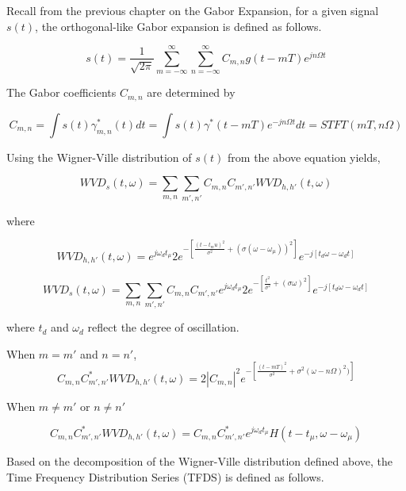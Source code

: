 Recall from the previous chapter on the Gabor Expansion, for a given signal $s(t)$, the orthogonal-like Gabor expansion is defined as follows. 

\begin{equation}
s(t) = \frac{1}{\sqrt{2\pi}} \sum_{m=-\infty}^{\infty} \sum_{n=-\infty}^{\infty} C_{m,n} g(t-mT) e^{jn\Omega t}
\end{equation}

The Gabor coefficients $C_{m,n}$ are determined by

\begin{equation}
C_{m,n} = \int s(t) \gamma^{*}_{m,n}(t) dt = \int s(t) \gamma^{*}(t-mT)e^{-jn\Omega t} dt = STFT(mT,n\Omega)
\end{equation}

Using the Wigner-Ville distribution of $s(t)$ from the above equation yields,

\begin{equation}
WVD_s(t,\omega) = \sum_{m,n} \sum_{m',n'} C_{m,n} C_{m',n'} WVD_{h,h'}(t,\omega)
\end{equation}

where


\begin{equation}
 WVD_{h,h'}(t,\omega) = e^{j\omega_d t_\mu} 2e^{-[\frac{(t-t_mu)^2}{\sigma^2}+(\sigma (\omega-\omega_\mu))^2]} e^{-j[t_d\omega - \omega_d t]}
\end{equation}

\begin{equation}
WVD_s(t,\omega) = \sum_{m,n} \sum_{m',n'} C_{m,n} C_{m',n'} e^{j\omega_d t_\mu} 2e^{-[\frac{t^2}{\sigma^2}+(\sigma \omega)^2]} e^{-j[t_d\omega - \omega_dt]}
\end{equation}

where $t_d$ and $\omega_d$ reflect the degree of oscillation. 

When $m=m'$ and $n=n'$, 
\begin{equation}
C_{m,n} C^*_{m',n'} WVD_{h,h'}(t,\omega) = 2|C_{m,n}|^2 e^{-[\frac{(t-mT)^2}{\sigma^2}+\sigma^2 (\omega-n\Omega)^2)]} 
\end{equation}

When $m\neq m'$ or $n \neq n'$

\begin{equation}
C_{m,n} C^*_{m',n'} WVD_{h,h'}(t,\omega) = C_{m,n}C^{*}_{m',n'} e^{j\omega_d t_\mu} H(t-t_\mu,\omega-\omega_\mu)
\end{equation}

Based on the decomposition of the Wigner-Ville distribution defined above, the Time Frequency Distribution Series (TFDS) is defined as follows. 

